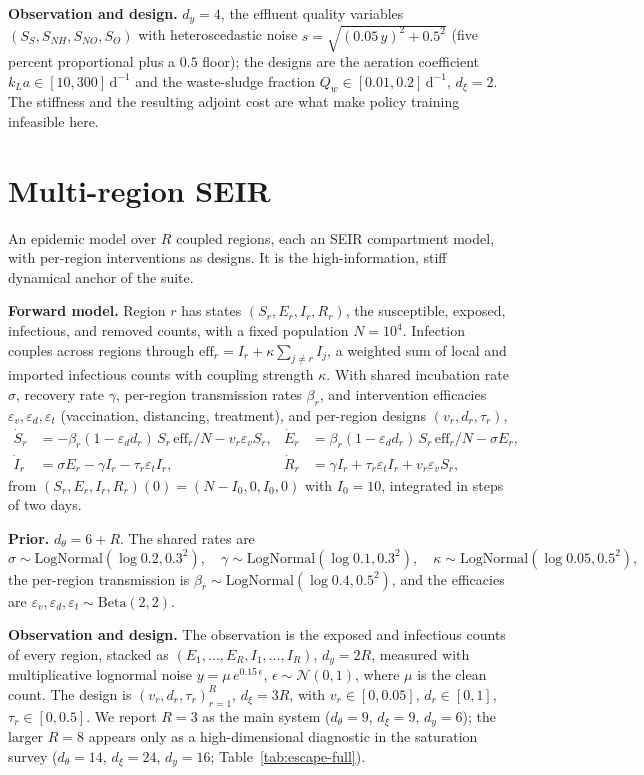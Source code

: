 \textbf{Observation and design.} $d_y=4$, the effluent quality variables
$(S_S,S_{NH},S_{NO},S_O)$ with heteroscedastic noise $s=\sqrt{(0.05\,y)^2+0.5^2}$ (five
percent proportional plus a $0.5$ floor); the designs are the aeration coefficient
$k_La\in[10,300]\,\mathrm{d}^{-1}$ and the waste-sludge fraction
$Q_w\in[0.01,0.2]\,\mathrm{d}^{-1}$, $d_\xi=2$. The stiffness and the resulting adjoint
cost are what make policy training infeasible here.

\section{Multi-region SEIR}
An epidemic model over $R$ coupled regions, each an SEIR compartment model, with
per-region interventions as designs. It is the high-information, stiff dynamical anchor of
the suite.

\textbf{Forward model.} Region $r$ has states $(S_r,E_r,I_r,R_r)$, the susceptible,
exposed, infectious, and removed counts, with a fixed population $N=10^4$. Infection
couples across regions through $\mathrm{eff}_r=I_r+\kappa\sum_{j\ne r}I_j$, a weighted sum
of local and imported infectious counts with coupling strength $\kappa$. With shared
incubation rate $\sigma$, recovery rate $\gamma$, per-region transmission rates $\beta_r$,
and intervention efficacies $\varepsilon_v,\varepsilon_d,\varepsilon_t$ (vaccination,
distancing, treatment), and per-region designs $(v_r,d_r,\tau_r)$,
\begin{align*}
\dot S_r &= -\beta_r(1-\varepsilon_d d_r)\,S_r\,\mathrm{eff}_r/N-v_r\varepsilon_v S_r, &
\dot E_r &= \beta_r(1-\varepsilon_d d_r)\,S_r\,\mathrm{eff}_r/N-\sigma E_r,\\
\dot I_r &= \sigma E_r-\gamma I_r-\tau_r\varepsilon_t I_r, &
\dot R_r &= \gamma I_r+\tau_r\varepsilon_t I_r+v_r\varepsilon_v S_r,
\end{align*}
from $(S_r,E_r,I_r,R_r)(0)=(N-I_0,0,I_0,0)$ with $I_0=10$, integrated in steps of two
days.

\textbf{Prior.} $d_\theta=6+R$. The shared rates are
\[
\sigma\sim\mathrm{LogNormal}(\log 0.2,0.3^2),\quad
\gamma\sim\mathrm{LogNormal}(\log 0.1,0.3^2),\quad
\kappa\sim\mathrm{LogNormal}(\log 0.05,0.5^2),
\]
the per-region transmission is $\beta_r\sim\mathrm{LogNormal}(\log 0.4,0.5^2)$, and the
efficacies are $\varepsilon_v,\varepsilon_d,\varepsilon_t\sim\mathrm{Beta}(2,2)$.

\textbf{Observation and design.} The observation is the exposed and infectious counts of
every region, stacked as $(E_1,\dots,E_R,I_1,\dots,I_R)$, $d_y=2R$, measured with
multiplicative lognormal noise $y=\mu\,e^{0.15\,\epsilon}$, $\epsilon\sim\mathcal N(0,1)$,
where $\mu$ is the clean count. The design is $(v_r,d_r,\tau_r)_{r=1}^R$, $d_\xi=3R$, with
$v_r\in[0,0.05]$, $d_r\in[0,1]$, $\tau_r\in[0,0.5]$. We report $R=3$ as the main system
($d_\theta=9$, $d_\xi=9$, $d_y=6$); the larger $R=8$ appears only as a high-dimensional
diagnostic in the saturation survey ($d_\theta=14$, $d_\xi=24$, $d_y=16$;
Table~\ref{tab:escape-full}).

